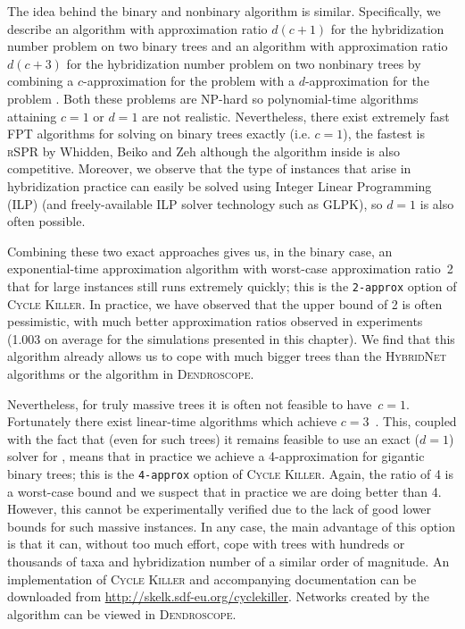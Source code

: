 The idea behind the binary and nonbinary algorithm is similar. Specifically, we describe an algorithm with approximation ratio ${d(c+1)}$ for the hybridization number problem on two binary trees and an algorithm with approximation ratio ${d(c+3)}$ for the hybridization number problem on two nonbinary trees by combining a $c$-approximation for the problem \maf with a $d$-approximation for the problem \dfvs. Both these problems are NP-hard so polynomial-time algorithms attaining $c=1$ or $d=1$ are not realistic. Nevertheless, there exist extremely fast FPT algorithms for solving \maf on binary trees exactly (i.e. $c=1$), the fastest is \textsc{rSPR} by Whidden, Beiko and Zeh \cite{whiddenRSPRwebsite,whiddenRSPRexp} although the \maf algorithm inside \cite{chen2013ultrafast} is also competitive. Moreover, we observe that the type of \dfvs instances that arise in hybridization practice can easily be solved using Integer Linear Programming (ILP) (and freely-available ILP solver technology such as GLPK), so $d=1$ is also often possible. 

Combining these two exact approaches gives us, in the binary case, an exponential-time approximation algorithm with worst-case approximation ratio~2 that for large instances still runs extremely quickly; this is the \texttt{2-approx} option of \textsc{Cycle Killer}. In practice, we have observed that the upper bound of 2 is often pessimistic, with much better approximation ratios observed in experiments (1.003 on average for the simulations presented in this chapter). We find that this algorithm already allows us to cope with much bigger trees than the \textsc{HybridNet} algorithms or the algorithm in \textsc{Dendroscope}.

Nevertheless, for truly massive trees it is often not feasible to have~${c=1}$. Fortunately there exist linear-time algorithms which achieve $c=3$~\cite{whiddenFixed}. This, coupled with the fact that (even for such trees) it remains feasible to use an exact ($d=1$) solver for \dfvs, means that in practice we achieve a 4-approximation for gigantic binary trees; this is the \texttt{4-approx} option of \textsc{Cycle Killer}. Again, the ratio of 4  is a worst-case bound and we suspect that in practice we are doing better than 4. However, this cannot be experimentally verified due to the lack of good lower bounds for such massive instances. In any case, the main advantage of this option is that it can, without too much effort, cope with trees with hundreds or thousands of taxa and hybridization number of a similar order of magnitude. An implementation of \textsc{Cycle Killer} and accompanying documentation can be downloaded from \url{http://skelk.sdf-eu.org/cyclekiller}. Networks created by the algorithm can be viewed in \textsc{Dendroscope}.

